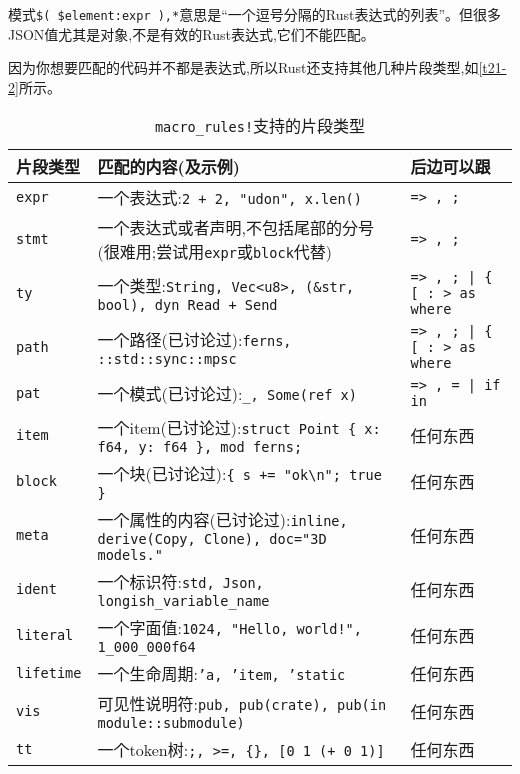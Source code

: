 模式\texttt{\$( \$element:expr ),*}意思是“一个逗号分隔的Rust表达式的列表”。但很多JSON值尤其是对象,不是有效的Rust表达式,它们不能匹配。

因为你想要匹配的代码并不都是表达式,所以Rust还支持其他几种片段类型,如\autoref{t21-2}所示。

\begin{table}[htbp]
    \centering
    \caption{\texttt{macro\_rules!}支持的片段类型}
    \label{t21-2}
    \begin{tabular}{lp{}p{}}
        \hline
        \textbf{片段类型}   & \textbf{匹配的内容(及示例)} &   \textbf{后边可以跟} \\
        \hline
        \texttt{expr}   & 一个表达式:\texttt{2 + 2, "udon", x.len()}   & \texttt{=> , ;}   \\
        \rowcolor{tablecolor}
        \texttt{stmt}   & 一个表达式或者声明,不包括尾部的分号(很难用;尝试用\texttt{expr}或\texttt{block}代替)   & \texttt{=> , ;} \\
        \texttt{ty} & 一个类型:\texttt{String, Vec<u8>, (\&str, bool), dyn Read + Send}    & \texttt{=> , ; | \{ [ : > as where} \\
        \rowcolor{tablecolor}
        \texttt{path}   & 一个路径(已讨论过):\texttt{ferns, ::std::sync::mpsc}   & \texttt{=> , ; | \{ [ : > as where} \\
        \texttt{pat}    & 一个模式(已讨论过):\texttt{\_, Some(ref x)}    & \texttt{=> , = | if in} \\
        \rowcolor{tablecolor}
        \texttt{item}   & 一个item(已讨论过):\texttt{struct Point \{ x: f64, y: f64 \}, mod ferns;}  & 任何东西 \\
        \texttt{block}  & 一个块(已讨论过):\texttt{\{ s += "ok\textbackslash n"; true \}}  & 任何东西  \\
        \rowcolor{tablecolor}
        \texttt{meta}   & 一个属性的内容(已讨论过):\texttt{inline, derive(Copy, Clone), doc="3D models."} & 任何东西 \\
        \texttt{ident}  & 一个标识符:\texttt{std, Json, longish\_variable\_name}   & 任何东西 \\
        \rowcolor{tablecolor}
        \texttt{literal}& 一个字面值:\texttt{1024, "Hello, world!", 1\_000\_000f64}    & 任何东西 \\
        \texttt{lifetime} & 一个生命周期:\texttt{'a, 'item, 'static}   & 任何东西 \\
        \rowcolor{tablecolor}
        \texttt{vis}    & 可见性说明符:\texttt{pub, pub(crate), pub(in module::submodule)} & 任何东西 \\
        \texttt{tt}     & 一个token树:\texttt{;, >=, \{\}, [0 1 (+ 0 1)]}  & 任何东西 \\
    \end{tabular}
\end{table}

